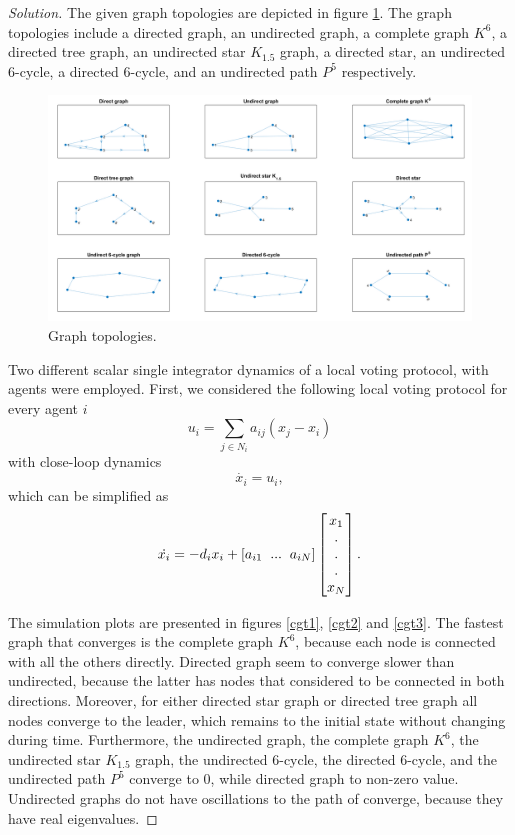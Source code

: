 \documentclass[12pt]{article}
\newenvironment{solution}{\begin{proof}[Solution]}{\end{proof}}
\begin{document}
\begin{solution}
The given graph topologies are depicted in figure \ref{graphs}. The graph topologies include a directed graph, an undirected graph, a complete graph $K^6$, a directed tree graph, an undirected star $K_{1.5}$ graph, a directed star, an undirected 6-cycle, a directed 6-cycle, and an undirected path $P^5$ respectively.
\begin{figure}[!h]
	\includegraphics[scale=0.31]{figures/Graphs.png}
	\centering
	\caption{Graph topologies.}
	\label{graphs}
\end{figure}

Two different scalar single integrator dynamics of a local voting protocol, with agents were employed. First, we considered the following local voting protocol for every agent $i$
\begin{equation*}
u_i = \sum_{j \in N_i}a_{ij}(x_j-x_i)
\end{equation*}
with close-loop dynamics 
\begin{equation*}
\dot{x_i} = u_i,
\end{equation*}
which can be simplified as
\begin{equation*}
\dot{x_i} = -d_ix_i + [a_{i1}\hspace{.2cm}...\hspace{.2cm}a_{iN}]\begin{bmatrix}
x_1\\
.\\
.\\
.\\
x_N
\end{bmatrix}.
\end{equation*}
\vspace{.5cm}

The simulation plots are presented in figures \ref{cgt1}, \ref{cgt2} and \ref{cgt3}. The fastest graph that converges is the complete graph $K^6$, because each node is connected with all the others directly. Directed graph seem to converge slower than undirected, because the latter has nodes that considered to be connected in both directions. Moreover, for either directed star graph or directed tree graph all nodes converge to the leader, which remains to the initial state without changing during time. Furthermore, the undirected graph, the complete graph $K^6$, the undirected star $K_{1.5}$ graph, the undirected 6-cycle, the directed 6-cycle, and the undirected path $P^5$ converge to 0, while directed graph to non-zero value. Undirected graphs do not have oscillations to the path of converge, because they have real eigenvalues.


\end{solution}
\end{document}
